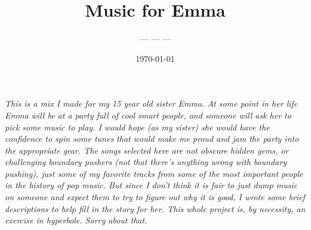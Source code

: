 \documentclass[letterpaper,single]{article}
\title{Music for Emma}
\date{\today}
\author{--- --- --- }
\begin{document}
 
\maketitle
\textit{This is a mix I made for my 15 year old sister Emma. At some point in
her life Emma will be at a party full of cool smart people, and someone
will ask her to pick some music to play. I would hope (as my sister) she
would have the confidence to spin some tunes that would make me proud
and jam the party into the appropriate gear. The songs selected here
are not obscure hidden gems, or challenging boundary pushers (not that
there's anything wrong with boundary pushing), just some of my favorite
tracks from some of the most important people in the history of pop
music. But since I don't think it is fair to just dump music on someone
and expect them to try to figure out why it is good, I wrote some brief
descriptions to help fill in the story for her. This whole project is,
by necessity, an exercise in hyperbole. Sorry about that.}\\
\\
\end{document}
